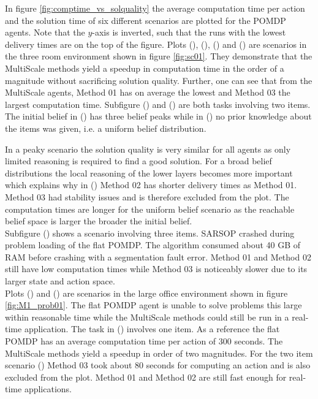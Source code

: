 In figure \ref{fig:comptime_vs_solquality} the average computation time per action and the solution time of six different scenarios are plotted for the POMDP agents. Note that the $y$-axis is inverted, such that the runs with the lowest delivery times are on the top of the figure. Plots (), (), () and () are scenarios in the three room environment shown in figure \ref{fig:sc01}. They demonstrate that the MultiScale methods yield a speedup in computation time in the order of a magnitude without sacrificing solution quality. Further, one can see that from the MultiScale agents, Method 01 has on average the lowest and Method 03 the largest computation time.
Subfigure () and () are both tasks involving two items. The initial belief in () has three belief peaks while in () no prior knowledge about the items was given, i.e. a uniform belief distribution.

In a peaky scenario the solution quality is very similar for all agents as only limited reasoning is required to find a good solution. For a broad belief distributions the local reasoning of the lower layers becomes more important which explains why in () Method 02 has shorter delivery times as Method 01.  Method 03 had stability issues and is therefore excluded from the plot. The computation times are longer for the uniform belief scenario as the reachable belief space is larger the broader the initial belief.\\
Subfigure () shows a scenario involving three items. SARSOP crashed during problem loading of the flat POMDP. The algorithm consumed about 40 GB of RAM before crashing with a segmentation fault error. Method 01 and Method 02 still have low computation times while Method 03 is noticeably slower due to its larger state and action space.\\
Plots () and () are scenarios in the large office environment shown in figure \ref{fig:M1_prob01}. The flat POMDP agent is unable to solve problems this large within reasonable time while the MultiScale methods could still be run in a real-time application. The task in () involves one item. As a reference the flat POMDP has an average computation time per action of 300 seconds. The MultiScale methods yield a speedup in order of two magnitudes. For the two item scenario () Method 03 took about 80 seconds for computing an action and is also excluded from the plot. Method 01 and Method 02 are still fast enough for real-time applications.\\

